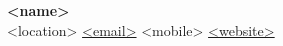 
\begin{center}
	{\Huge \textbf{<name>}} \\[0.3em]
	\vspace{2pt}
	{\small <location> \;\textbar\; \href{mailto:<email>}{<email>} \;\textbar\; <mobile> \;\textbar\; \href{<website>}{<website>}}
\end{center}
